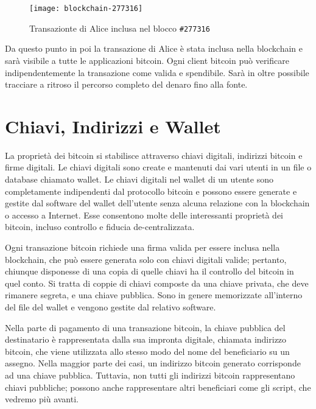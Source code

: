 \begin{figure}
	\centering 
	\texttt{[image: blockchain-277316]} 
	\caption[Transazionte di Alice inclusa nel blocco \texttt{\#277316}]{Transazionte di Alice inclusa nel blocco \texttt{\#277316}}
	\label{fig:blockchain-277316} 
\end{figure}
Da questo punto in poi la transazione di Alice è stata inclusa nella blockchain e sarà visibile a tutte le applicazioni bitcoin. Ogni client bitcoin può verificare indipendentemente la transazione come valida e spendibile. Sarà in oltre possibile tracciare a ritroso il percorso completo del denaro fino alla fonte.

\section{Chiavi, Indirizzi e Wallet}
La proprietà dei bitcoin si stabilisce attraverso chiavi digitali, indirizzi bitcoin e firme digitali. Le chiavi digitali sono create e mantenuti dai vari utenti in un file o database chiamato wallet. Le chiavi digitali nel wallet di un utente sono completamente indipendenti dal protocollo bitcoin e possono essere generate e gestite dal software del wallet dell’utente senza alcuna relazione con la blockchain o accesso a Internet. Esse consentono molte delle interessanti proprietà dei bitcoin, incluso controllo e fiducia de-centralizzata.

Ogni transazione bitcoin richiede una firma valida per essere inclusa nella blockchain, che può essere generata solo con chiavi digitali valide; pertanto, chiunque disponesse di una copia di quelle chiavi ha il controllo del bitcoin in quel conto. Si tratta di coppie di chiavi composte da una chiave privata, che deve rimanere segreta, e una chiave pubblica. Sono in genere memorizzate all'interno del file del wallet e vengono gestite dal relativo software. 

Nella parte di pagamento di una transazione bitcoin, la chiave pubblica del destinatario è rappresentata dalla sua impronta digitale, chiamata indirizzo bitcoin, che viene utilizzata allo stesso modo del nome del beneficiario su un assegno. Nella maggior parte dei casi, un indirizzo bitcoin generato corrisponde ad una chiave pubblica. Tuttavia, non tutti gli indirizzi bitcoin rappresentano chiavi pubbliche; possono anche rappresentare altri beneficiari come gli script, che vedremo più avanti.

